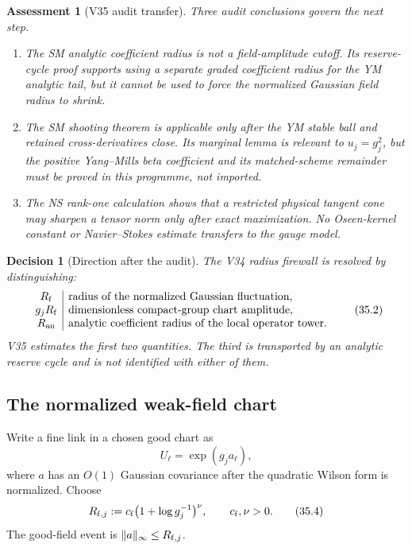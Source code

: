 \documentclass[11pt,oneside]{book}
\newtheorem{assessment}[theorem]{Assessment}
\newtheorem{decision}[theorem]{Decision}
\theoremstyle{definition}
\theoremstyle{remark}
\begin{document}
\begin{assessment}[V35 audit transfer]
\label{ass:e8v35-audit}
Three audit conclusions govern the next step.
\begin{enumerate}
\item The SM analytic coefficient radius is not a field-amplitude
      cutoff.  Its reserve-cycle proof supports using a separate
      graded coefficient radius for the YM analytic tail, but it
      cannot be used to force the normalized Gaussian field radius
      to shrink.
\item The SM shooting theorem is applicable only after the YM stable
      ball and retained cross-derivatives close.  Its marginal lemma
      is relevant to \(u_j=g_j^2\), but the positive Yang--Mills beta
      coefficient and its matched-scheme remainder must be proved in
      this programme, not imported.
\item The NS rank-one calculation shows that a restricted physical
      tangent cone may sharpen a tensor norm only after exact
      maximization.  No Oseen-kernel constant or Navier--Stokes
      estimate transfers to the gauge model.
\end{enumerate}
\end{assessment}

\begin{decision}[Direction after the audit]
\label{dec:e8v35-audit}
The V34 radius firewall is resolved by distinguishing:
\[
\begin{array}{c|l}
R_{\rm f}&\text{radius of the normalized Gaussian fluctuation},\\
g_jR_{\rm f}&\text{dimensionless compact-group chart amplitude},\\
R_{\rm an}&\text{analytic coefficient radius of the local
operator tower}.
\end{array}                                                       \tag{35.2}
\]
V35 estimates the first two quantities.  The third is transported by
an analytic reserve cycle and is not identified with either of them.
\end{decision}

\subsection{The normalized weak-field chart}

Write a fine link in a chosen good chart as
\[
                         U_\ell=\exp(g_j a_\ell),                 \tag{35.3}
\]
where \(a\) has an \(O(1)\) Gaussian covariance after the quadratic
Wilson form is normalized.  Choose
\[
 R_{{\rm f},j}:=
 c_{\rm f}\bigl(1+\log g_j^{-1}\bigr)^{\nu},
\qquad c_{\rm f},\nu>0.                                         \tag{35.4}
\]
The good-field event is \(\|a\|_\infty\leq R_{{\rm f},j}\).
\end{document}
